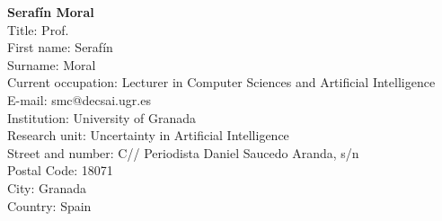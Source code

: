 \documentclass[11pt,dvipsnames,usenames,a4paper]{article}
\begin{document}
\newpage
{\bf Seraf\'in Moral}\\
Title: Prof.\\
First name: Seraf\'in\\
Surname:  Moral \\
Current occupation: Lecturer in Computer Sciences and Artificial Intelligence\\
E-mail: smc@decsai.ugr.es\\
Institution: University of Granada\\
Research unit: Uncertainty in Artificial Intelligence\\
Street and number: C// Periodista Daniel Saucedo Aranda, s/n\\
Postal Code: 18071\\
City: Granada\\
Country: Spain\\[-7pt]







\end{document}
